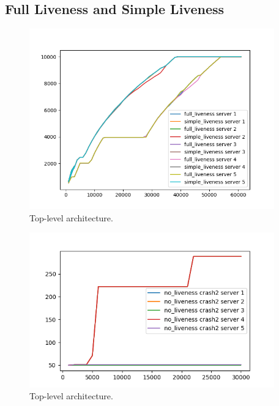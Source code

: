 \documentclass[11pt]{article}
\begin{document}
\subsection*{Full Liveness and Simple Liveness}
\begin{figure}[H]
    \centering
    \includegraphics[width=400px]{full_liveness_vs_simple.png}
    \caption{Top-level architecture.}
    \vspace{-15pt}
\end{figure}
\begin{figure}[H]
    \centering
    \includegraphics[width=400px]{crash2.png}
    \caption{Top-level architecture.}
    \vspace{-15pt}
\end{figure}
\end{document}
